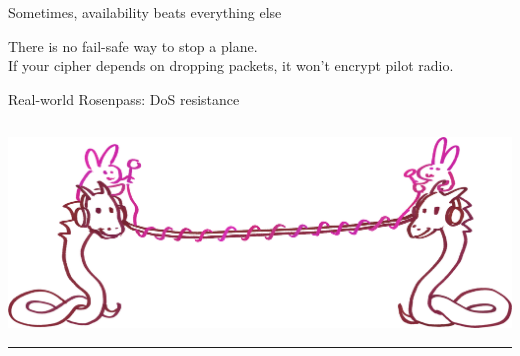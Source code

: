 \begin{frame}{Sometimes, availability beats everything else}
  \begin{minipage}{.45\pagewidth}
    There is no fail-safe way to stop a plane.
    \\[1.3em] If your cipher depends on dropping packets, it won't encrypt pilot radio.
  \end{minipage}
\end{frame}

\SetNextBackground{}
\begin{frame}{Real-world Rosenpass: DoS resistance}
  \begin{columns}[]
    \begin{column}{.2\textwidth}
      \includegraphics[width=\textwidth-.4pt,clip,trim=0 0 2300 0]{graphics/wireguard-and-rp-bunny-rose.png}\rule{.4pt}{.45\textheight}
    \end{column}


\end{columns}
\end{frame}
